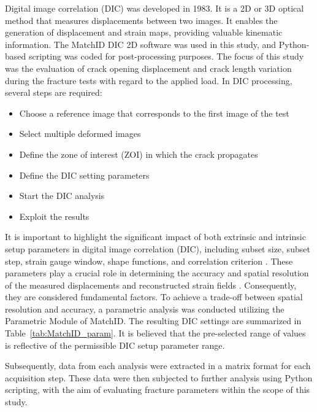 \documentclass[3p,times,procedia]{elsarticle}
\begin{document}
Digital image correlation (DIC) was developed in 1983. It is a 2D or 3D optical method that measures displacements between two images. It enables the generation of displacement and strain maps, providing valuable kinematic information. The MatchID DIC 2D software was used in this study, and Python-based scripting was coded for post-processing purposes.
The focus of this study was the evaluation of crack opening displacement and crack length variation during the fracture tests with regard to the applied load.
In DIC processing, several steps are required:

\begin{itemize}
	\item Choose a reference image that corresponds to the first image of the test 
	\item Select multiple deformed images
	\item Define the zone of interest (ZOI) in which the crack propagates
	\item Define the  DIC setting parameters
	\item Start the DIC analysis
	\item Exploit the results
\end{itemize}

It is important to highlight the significant impact of both extrinsic and intrinsic setup parameters in digital image correlation (DIC), including subset size, subset step, strain gauge window, shape functions, and correlation criterion \citep{DICguide2018}. These parameters play a crucial role in determining the accuracy and spatial resolution of the measured displacements and reconstructed strain fields \citep{Xavier2012207,PereiraandXavier2018}. Consequently, they are considered fundamental factors. To achieve a trade-off between spatial resolution and accuracy, a parametric analysis was conducted utilizing the Parametric Module of MatchID. The resulting DIC settings are summarized in Table~\ref{tab:MatchID_param}. It is believed that the pre-selected range of values is reflective of the permissible DIC setup parameter range.

Subsequently, data from each analysis were extracted in a matrix format for each acquisition step. These data were then subjected to further analysis using Python scripting, with the aim of evaluating fracture parameters within the scope of this study.
\end{document}
